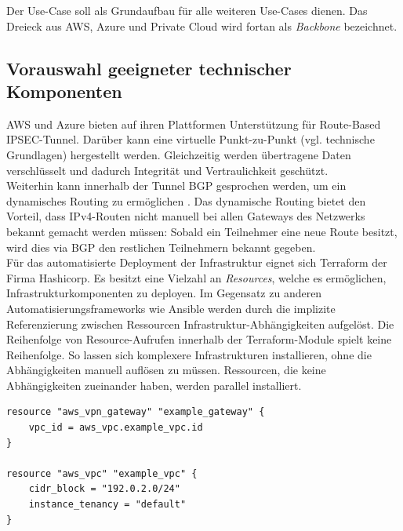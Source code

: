 
Der Use-Case soll als Grundaufbau für alle weiteren Use-Cases dienen. Das Dreieck aus AWS, Azure und Private Cloud wird fortan als \textit{Backbone} bezeichnet.

\subsection{Vorauswahl geeigneter technischer Komponenten}
AWS und Azure bieten auf ihren Plattformen Unterstützung für Route-Based IPSEC-Tunnel. Darüber kann eine virtuelle Punkt-zu-Punkt (vgl. technische Grundlagen) hergestellt werden. Gleichzeitig werden übertragene Daten verschlüsselt und dadurch Integrität und Vertraulichkeit geschützt.\\
Weiterhin kann innerhalb der Tunnel BGP gesprochen werden, um ein dynamisches Routing zu ermöglichen \cite[S. 19]{AlShawi2020} \cite[S. 74-79]{Toroman2019}. Das dynamische Routing bietet den Vorteil, dass IPv4-Routen nicht manuell bei allen Gateways des Netzwerks bekannt gemacht werden müssen: Sobald ein Teilnehmer eine neue Route besitzt, wird dies via BGP den restlichen Teilnehmern bekannt gegeben.\\
Für das automatisierte Deployment der Infrastruktur eignet sich Terraform der Firma Hashicorp. Es besitzt eine Vielzahl an \textit{Resources}, welche es ermöglichen, Infrastrukturkomponenten  zu deployen. Im Gegensatz zu anderen Automatisierungsframeworks wie Ansible werden durch die implizite Referenzierung zwischen Ressourcen Infrastruktur-Abhängigkeiten aufgelöst.
Die Reihenfolge von Resource-Aufrufen innerhalb der Terraform-Module spielt keine Reihenfolge. So lassen sich komplexere Infrastrukturen installieren, ohne die Abhängigkeiten manuell auflösen zu müssen. Ressourcen, die keine Abhängigkeiten zueinander haben, werden parallel installiert.

\begin{lstlisting}[label=terraform-implicit-dependeny,caption=Durch die implizite Referenz auf \textit{aws\_vpc.example\_vpc.id} wird zuerst die Ressource \textit{example\_vpc} ausgeführt]
resource "aws_vpn_gateway" "example_gateway" {
	vpc_id = aws_vpc.example_vpc.id
}

resource "aws_vpc" "example_vpc" {
	cidr_block = "192.0.2.0/24"
	instance_tenancy = "default"
}
\end{lstlisting}

